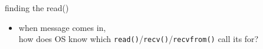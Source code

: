 \begin{frame}{finding the read()}
    \begin{itemize}
    \item when message comes in, \\
        how does OS know which \texttt{read()}/\texttt{recv()}/\texttt{recvfrom()} call its for?
    \end{itemize}
\end{frame}
